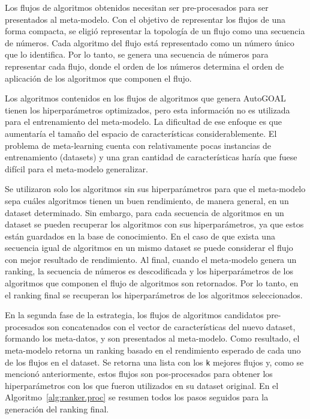 Los flujos de algoritmos obtenidos necesitan ser pre-procesados para ser presentados al meta-modelo. Con el objetivo de representar los flujos de una forma compacta, se eligió representar la topología de un flujo como una secuencia de números. Cada algoritmo del flujo está representado como un número único que lo identifica. Por lo tanto, se genera una secuencia de números para representar cada flujo, donde el orden de los números determina el orden de aplicación de los algoritmos que componen el flujo.

Los algoritmos contenidos en los flujos de algoritmos que genera AutoGOAL tienen los hiperparámetros optimizados, pero esta información no es utilizada para el entrenamiento del meta-modelo. La dificultad de ese enfoque es que aumentaría el tamaño del espacio de características considerablemente. El problema de meta-learning cuenta con relativamente pocas instancias de entrenamiento (datasets) y una gran cantidad de características haría que fuese difícil para el meta-modelo generalizar.

Se utilizaron solo los algoritmos sin sus hiperparámetros para que el meta-modelo sepa cuáles algoritmos tienen un buen rendimiento, de manera general, en un dataset determinado. Sin embargo, para cada secuencia de algoritmos en un dataset se pueden recuperar los algoritmos con sus hiperparámetros, ya que estos están guardados en la base de conocimiento. En el caso de que exista una secuencia igual de algoritmos en un mismo dataset se puede considerar el flujo con mejor resultado de rendimiento. Al final, cuando el meta-modelo genera un ranking, la secuencia de números es descodificada y los hiperparámetros de los algoritmos que componen el flujo de algoritmos son retornados. Por lo tanto, en el ranking final se recuperan los hiperparámetros de los algoritmos seleccionados.

En la segunda fase de la estrategia, los flujos de algoritmos candidatos pre-procesados son concatenados con el vector de características del nuevo dataset, formando los meta-datos, y son presentados al meta-modelo. Como resultado, el meta-modelo retorna un ranking basado en el rendimiento esperado de cada uno de los flujos en el dataset. Se retorna una lista con los \texttt{k} mejores flujos y, como se mencionó anteriormente, estos flujos son pos-procesados para obtener los hiperparámetros con los que fueron utilizados en su dataset original. En el Algoritmo~\ref{alg:ranker.proc} se resumen todos los pasos seguidos para la generación del ranking final.
 

